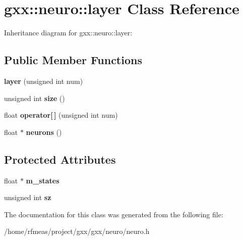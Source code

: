 \hypertarget{classgxx_1_1neuro_1_1layer}{}\section{gxx\+:\+:neuro\+:\+:layer Class Reference}
\label{classgxx_1_1neuro_1_1layer}


Inheritance diagram for gxx\+:\+:neuro\+:\+:layer\+:
\subsection*{Public Member Functions}
\begin{DoxyCompactItemize}
\item 
{\bfseries layer} (unsigned int num)\hypertarget{classgxx_1_1neuro_1_1layer_ad050a4280f240fc5da169c8c15918321}{}\label{classgxx_1_1neuro_1_1layer_ad050a4280f240fc5da169c8c15918321}

\item 
unsigned int {\bfseries size} ()\hypertarget{classgxx_1_1neuro_1_1layer_a0767069d8cb5d3c1eca5bf3389b0d41f}{}\label{classgxx_1_1neuro_1_1layer_a0767069d8cb5d3c1eca5bf3389b0d41f}

\item 
float {\bfseries operator\mbox{[}$\,$\mbox{]}} (unsigned int num)\hypertarget{classgxx_1_1neuro_1_1layer_a1c2e75050cff1c5156d1757dd8846d8e}{}\label{classgxx_1_1neuro_1_1layer_a1c2e75050cff1c5156d1757dd8846d8e}

\item 
float $\ast$ {\bfseries neurons} ()\hypertarget{classgxx_1_1neuro_1_1layer_a38ff52798a2ad3439efe60be3d9b6781}{}\label{classgxx_1_1neuro_1_1layer_a38ff52798a2ad3439efe60be3d9b6781}

\end{DoxyCompactItemize}
\subsection*{Protected Attributes}
\begin{DoxyCompactItemize}
\item 
float $\ast$ {\bfseries m\+\_\+states}\hypertarget{classgxx_1_1neuro_1_1layer_a312e28d1678b384718cb58185e253b3c}{}\label{classgxx_1_1neuro_1_1layer_a312e28d1678b384718cb58185e253b3c}

\item 
unsigned int {\bfseries sz}\hypertarget{classgxx_1_1neuro_1_1layer_a20dd0dcda743314191e3ef3d87a7ba0d}{}\label{classgxx_1_1neuro_1_1layer_a20dd0dcda743314191e3ef3d87a7ba0d}

\end{DoxyCompactItemize}


The documentation for this class was generated from the following file\+:\begin{DoxyCompactItemize}
\item 
/home/rfmeas/project/gxx/gxx/neuro/neuro.\+h\end{DoxyCompactItemize}
